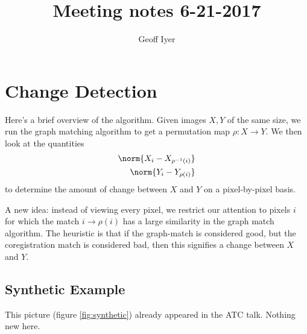 \documentclass[12pt]{article}
\title{Meeting notes 6-21-2017}
\author{Geoff Iyer}
\date{}
\begin{document}
\maketitle

\section{Change Detection}

Here's a brief overview of the algorithm. Given images $X,Y$ of the same size, we run the graph matching algorithm to get a permutation map $\rho: X\to Y$. We then look at the quantities
\begin{align}
  \norm{X_i - X_{\rho^{-1}(i)}} \\
  \norm{Y_i - Y_{\rho(i)}}
\end{align}
to determine the amount of change between $X$ and $Y$ on a pixel-by-pixel basis.

A new idea: instead of viewing every pixel, we restrict our attention to pixels $i$ for which the match $i \to \rho(i)$ has a large similarity in the graph match algorithm. The heuristic is that if the graph-match is considered good, but the coregistration match is considered bad, then this signifies a change between $X$ and $Y$.

\subsection{Synthetic Example}

This picture (figure \ref{fig:synthetic}) already appeared in the ATC talk. Nothing new here.
\end{document}
